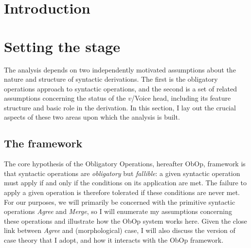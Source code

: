 \documentclass[11pt, letterpaper]{paper_nick}
\begin{document}


\section{Introduction}

\section{Setting the stage}
The analysis depends on two independently motivated assumptions about the nature and structure of syntactic derivations. The first is the obligatory operations \citep{preminger14} approach to syntactic operations, and the second is a set of related assumptions concerning the status of the $v$/Voice head, including its feature structure and basic role in the derivation. In this section, I lay out the crucial aspects of these two areas upon which the analysis is built. 
\subsection{The framework}
The core hypothesis of the Obligatory Operations, hereafter ObOp, framework is that syntactic operations are \emph{obligatory} but \emph{fallible}: a given syntactic operation must apply if and only if the conditions on its application are met. The failure to apply a given operation is therefore tolerated if these conditions are never met. For our purposes, we will primarily be concerned with the primitive syntactic operations \emph{Agree} and \emph{Merge}, so I will enumerate my assumptions concerning these operations and illustrate how the ObOp system works here. Given the close link between \emph{Agree} and (morphological) case, I will also discuss the version of case theory that I adopt, and how it interacts with the ObOp framework. 
\end{document}
